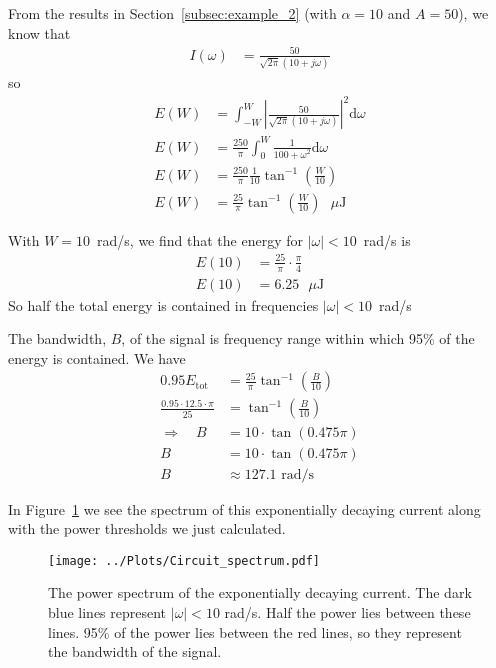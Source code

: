 \documentclass[twocolumn]{myarticle}
\renewcommand{\d}{\mathrm{d}}
\begin{document}
From the results in Section~\ref{subsec:example_2} (with $ \alpha = 10 $ and $ A = 50 $), we know that
\begin{align}
    I(\omega) &= \frac{50}{\sqrt{2\pi} ( 10 + j \omega)}
\end{align}
so
\begin{align}
    E(W) &= \int_{-W}^{W} \left| \frac{50}{\sqrt{2\pi} ( 10 + j \omega)} \right|^2 \d \omega
    \\
    E(W) &= \frac{250}{\pi} \int_{0}^{W} \frac{1}{100 + \omega^2} \d \omega
    \\
    E(W) &= \frac{250}{\pi} \frac{1}{10} \tan^{-1} \left( \frac{W}{10} \right)
    \\
    E(W) &= \frac{25}{\pi} \tan^{-1} \left( \frac{W}{10} \right) \text{ $\mu$J}
\end{align}

With $ W = 10 $~rad/s, we find that the energy for $ | \omega | < 10 $~rad/s is
\begin{align}
    E(10) &= \frac{25}{\pi} \cdot \frac{\pi}{4}
    \\
    E(10) &= 6.25 \text{ $\mu$J}
\end{align}
So half the total energy is contained in frequencies $ |\omega| < 10 $~rad/s

The bandwidth, $ B $, of the signal is frequency range within which 95\% of the energy is contained.
We have
\begin{align}
    0.95 E_\text{tot} &= \frac{25}{\pi} \tan^{-1} \left( \frac{B}{10} \right)
    \\
    \frac{0.95 \cdot 12.5 \cdot \pi}{25} &= \tan^{-1} \left( \frac{B}{10} \right)
    \\
    \Longrightarrow \quad B &= 10 \cdot \tan (0.475 \pi)
    \\
    B &= 10 \cdot \tan (0.475 \pi)
    \\
    B &\approx 127.1 \text{ rad/s}
\end{align}

In Figure~\ref{fig:circuit_spectrum} we see the spectrum of this exponentially decaying current along with the power thresholds we just calculated.

\begin{figure}[ht]
    \centering
    \texttt{[image: ../Plots/Circuit\_spectrum.pdf]}
    \caption{The power spectrum of the exponentially decaying current. The dark blue lines represent $ |\omega| < 10 $ rad/s. Half the power lies between these lines. 95\% of the power lies between the red lines, so they represent the bandwidth of the signal.}
    \label{fig:circuit_spectrum}
\end{figure}
\end{document}
